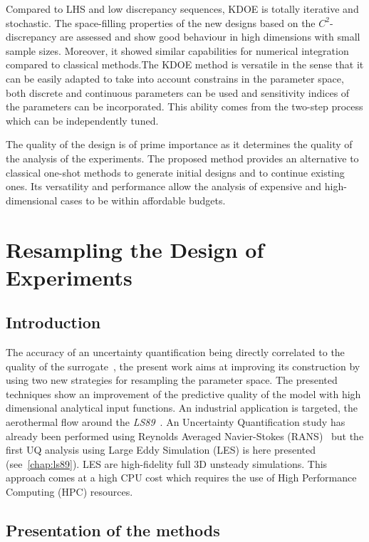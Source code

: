 Compared to LHS and low discrepancy sequences, KDOE is totally iterative and stochastic. The space-filling properties of the new designs based on the $C^2$-discrepancy are assessed and show good behaviour in high dimensions with small sample sizes. Moreover, it showed similar capabilities for numerical integration compared to classical methods.The KDOE method is versatile in the sense that it can be easily adapted to take into account constrains in the parameter space, both discrete and continuous parameters can be used and sensitivity indices of the parameters can be incorporated. This ability comes from the two-step process which can be independently tuned.

The quality of the design is of prime importance as it determines the quality of the analysis of the experiments. The proposed method provides an alternative to classical one-shot methods to generate initial designs and to continue existing ones. Its versatility and performance allow the analysis of expensive and high-dimensional cases to be within affordable budgets.


\chapter{Resampling the Design of Experiments}\label{chap:resample}
\section{Introduction}

The accuracy of an uncertainty quantification being directly correlated to the quality of the surrogate~\cite{iooss2010}, the present work aims at improving its construction by using two new strategies for resampling the parameter space. The presented techniques show an improvement of the predictive quality of the model with high dimensional analytical input functions. An industrial application is targeted, the aerothermal flow around the \textit{LS89}~\cite{arts1990}. An Uncertainty Quantification study has already been performed using Reynolds Averaged Navier-Stokes (RANS)~\cite{Gourdain2010,emory2016} but the first UQ analysis using Large Eddy Simulation (LES) is here presented (see~\cref{chap:ls89}). LES are high-fidelity full 3D unsteady simulations. This approach comes at a high CPU cost which requires the use of High Performance Computing (HPC) resources.

\section{Presentation of the methods}

